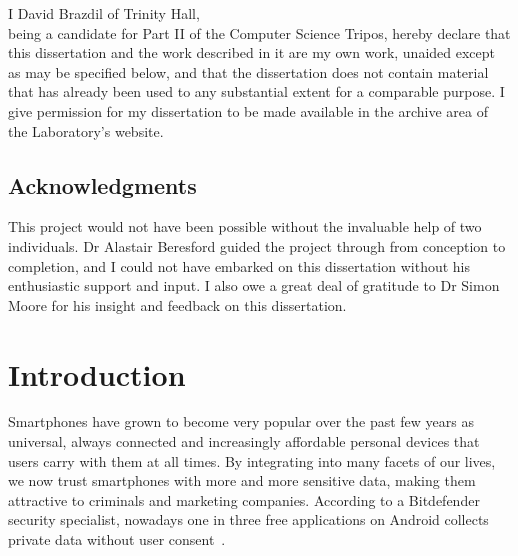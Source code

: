 \documentclass[12pt,twoside,notitlepage]{report}
\begin{document}
I David Brazdil of Trinity Hall,\\
being a candidate for Part II of the Computer Science Tripos,
hereby declare that this dissertation and the work described in it
are my own work, unaided except as may be specified below, and
that the dissertation does not contain material that has already
been used to any substantial extent for a comparable purpose.
I give permission for my dissertation to be made available in the archive
area of the Laboratory's website.

\bigskip
\bigskip
{}

\bigskip
\medskip
{}

\cleardoublepage

\tableofcontents

\newpage
\section*{Acknowledgments}

This project would not have been possible without the invaluable help of two individuals. Dr Alastair Beresford guided the project through from conception to completion, and I could not have embarked on this dissertation without his enthusiastic support and input. I also owe a great deal of gratitude to Dr Simon Moore for his insight and feedback on this dissertation.


\cleardoublepage        %

\setcounter{page}{1}
\pagestyle{headings}

\chapter{Introduction}

Smartphones have grown to become very popular over the past few years as universal, always connected and increasingly affordable personal devices that users carry with them at all times. By integrating into many facets of our lives, we now trust smartphones with more and more sensitive data, making them attractive to criminals and marketing companies. According to a Bitdefender security specialist, nowadays one in three free applications on Android collects private data without user consent~\cite{web:HuffingtonOneInThree}. 
\end{document}
